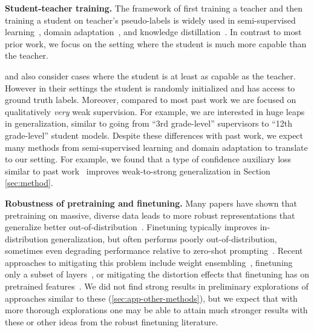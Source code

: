 \textbf{Student-teacher training.}\quad 
The framework of first training a teacher and then training a student on teacher's pseudo-labels is widely used in semi-supervised learning~\citep{laine2016temporal, tarvainen2017mean, xie2020self}, domain adaptation~\citep{french2017self,shu2018dirt}, and knowledge distillation~\citep{hinton2015distilling,gou2021knowledge, stanton2021does, beyer2022knowledge}. In contrast to most prior work, we focus on the setting where the student is much more capable than the teacher.

\citet{furlanello2018born} and \citet{xie2020self} also consider cases where the student is at least as capable as the teacher.  However in their settings the student is randomly initialized and has access to ground truth labels. Moreover, compared to most past work we are focused on qualitatively \textit{very} weak supervision. For example, we are interested in huge leaps in generalization, similar to going from ``3rd grade-level'' supervisors to ``12th grade-level'' student models. Despite these differences with past work, we expect many methods from semi-supervised learning and domain adaptation to translate to our setting. For example, we found that a type of confidence auxiliary loss similar to past work~\citep{grandvalet2004semi} improves weak-to-strong generalization in Section \ref{sec:method}.

\textbf{Robustness of pretraining and finetuning.} \quad Many papers have shown that pretraining on massive, diverse data leads to more robust representations that generalize better out-of-distribution~\citep{hendrycks2019using,hendrycks2020pretrained,radford2021learning,liu2022empirical}. Finetuning typically improves in-distribution generalization, but often performs poorly out-of-distribution, sometimes even degrading performance relative to zero-shot prompting~\citep{kumar2022fine, wortsman2022robust, awadalla2022exploring}. Recent approaches to mitigating this problem include weight ensembling~\citep{wortsman2022robust, wortsman2022model}, finetuning only a subset of layers~\citep{kirichenko2023last, lee2022surgical}, or mitigating the distortion effects that finetuning has on pretrained features~\citep{kumar2022fine}. We did not find strong results in preliminary explorations of approaches similar to these (\ref{sec:app-other-methods}), but we expect that with more thorough explorations one may be able to attain much stronger results with these or other ideas from the robust finetuning literature.

